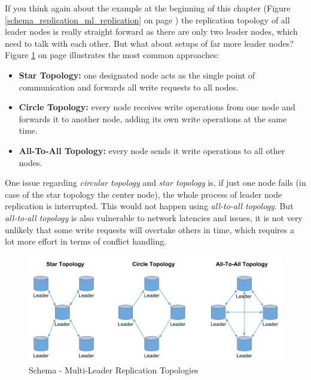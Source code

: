 {
If you think again about the example at the beginning of this chapter (Figure \ref{schema_replication_ml_replication} on page \pageref{schema_replication_ml_replication}) the replication topology of all leader nodes is really straight forward as there are only two leader nodes, which need to talk with each other. But what about setups of far more leader nodes?
Figure \ref{schema_replication_ml_topologies} on page \pageref{schema_replication_ml_topologies} illustrates the most common approaches:\\
\begin{itemize}
\item \textbf{Star Topology:} one designated node acts as the single point of communication and forwards all write requests to all nodes.
\item \textbf{Circle Topology:} every node receives write operations from one node and forwards it to another node, adding its own write operations at the same time.
\item \textbf{All-To-All Topology:} every node sends it write operations to all other nodes.\\
\end{itemize} 

One issue regarding \textit{circular topology} and \textit{star topology} is, if just one node fails (in case of the star topology the center node), the whole process of leader node replication is interrupted. This would not happen using \textit{all-to-all topology}. But \textit{all-to-all topology} is also vulnerable to network latencies and issues, it is not very unlikely that some write requests will overtake others in time, which requires a lot more effort in terms of conflict handling.

\begin{figure}[h]
	\centering
  \includegraphics[width=1\textwidth]{replication_schema_ml_topologies.png}
	\caption{Schema - Multi-Leader Replication Topologies}
	\label{schema_replication_ml_topologies}
\end{figure}

}
